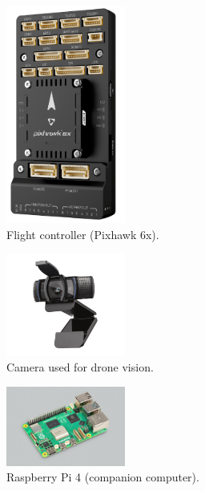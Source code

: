\begin{figure}[H]
    \centering
    \includegraphics[width=0.35\textwidth]{pictures/pixhawk6x.png}
    \caption{Flight controller (Pixhawk 6x).}
    \label{fig:pixhawk}
\end{figure}

\begin{figure}[H]
    \centering
    \includegraphics[width=0.35\textwidth]{pictures/camara.png}
    \caption{Camera used for drone vision.}
    \label{fig:camera}
\end{figure}

\begin{figure}[H]
    \centering
    \includegraphics[width=0.35\textwidth]{pictures/rpi5.jpeg}
    \caption{Raspberry Pi 4 (companion computer).}
    \label{fig:rpi4}
\end{figure}

\begin{figure}[H]
    \centering
    \label{fig:voltage_regulator}
\end{figure}

